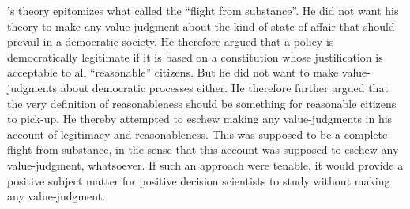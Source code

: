 \documentclass[preprint, french, english, 11pt, authoryear]{elsarticle}%
\begin{document}
\cite{rawls_political_2005}'s theory epitomizes what \cite{estlund_democratic_2009} called the ``flight from substance''. He did not want his theory to make any value-judgment about the kind of state of affair that should prevail in a democratic society. He therefore argued that a policy is democratically legitimate if it is based on a constitution whose justification is acceptable to all ``reasonable'' citizens. But he did not want to make value-judgments about democratic processes either. He therefore further argued that the very definition of reasonableness should be something for reasonable citizens to pick-up. He thereby attempted to eschew making any value-judgments in his account of legitimacy and reasonableness. This was supposed to be a complete flight from substance, in the sense that this account was supposed to eschew any value-judgment, whatsoever. If such an approach were tenable, it would provide a positive subject matter for positive decision scientists to study without making any value-judgment.
\end{document}
